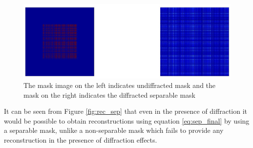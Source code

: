 \begin{figure}[ht]
\includegraphics[width=\linewidth]{pics/diffracted_mask}
\caption{The mask image on the left indicates undiffracted mask and the mask on the right indicates the diffracted separable mask}
\label{fig:diff_separable}
\end{figure}

It can be seen from Figure \ref{fig:rec_sep} that even in the presence of diffraction it would be possible to obtain reconstructions using equation \ref{eq:sep_final} by using a separable mask, unlike a non-separable mask which fails to provide any reconstruction in the presence of diffraction effects. 
